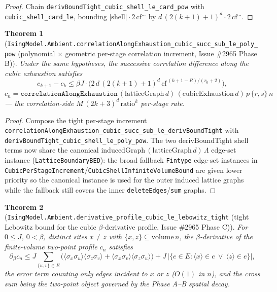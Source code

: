 \documentclass[a4paper,11pt]{article}
\newtheorem{theorem}{Theorem}
\begin{document}
\begin{proof}
Chain \texttt{derivBoundTight\_cubic\_shell\_le\_card\_pow} with
\texttt{cubic\_shell\_card\_le}, bounding $|\mathrm{shell}|\cdot
2\,\mathrm{cf}^{\dots}$ by $d\,(2(k+1)+1)^d\cdot 2\,\mathrm{cf}^{\dots}$.
\end{proof}

\begin{theorem}[\texttt{IsingModel.Ambient.correlationAlongExhaustion\_cubic\_succ\_sub\_le\_poly\_pow}
(polynomial $\times$ geometric per-stage correlation increment, Issue \#2965 Phase B)]
Under the same hypotheses, the successive correlation difference along the cubic
exhaustion satisfies
\[
  c_{k+1}-c_k \le \beta J\cdot\bigl(2\,d\,(2(k+1)+1)^d\,\mathrm{cf}^{\,(k+1-R)/(r_0+2)}\bigr),
\]
$c_n=\texttt{correlationAlongExhaustion}\,(\mathrm{latticeGraph}\,d)\,
(\mathrm{cubicExhaustion}\,d)\,p\,\{r,s\}\,n$ — the correlation-side
$M\,(2k+3)^d\,\mathrm{ratio}^k$ per-stage rate.
\end{theorem}

\begin{proof}
Compose the tight per-stage increment
\texttt{correlationAlongExhaustion\_cubic\_succ\_sub\_le\_derivBoundTight} with
\texttt{derivBoundTight\_cubic\_shell\_le\_poly\_pow}. The two
$\mathrm{derivBoundTight}$ shell terms now share the canonical
$\mathrm{inducedGraph}\,(\mathrm{latticeGraph}\,d)\,\Lambda$ edge-set instance
(\texttt{LatticeBoundaryBED}): the broad fallback \texttt{Fintype} edge-set instances
in \texttt{CubicPerStageIncrement}/\texttt{CubicShellInfiniteVolumeBound} are given
lower priority so the canonical instance is used for the outer induced lattice
graphs while the fallback still covers the inner \texttt{deleteEdges}/\texttt{sum}
graphs.
\end{proof}

\begin{theorem}[\texttt{IsingModel.Ambient.derivative\_profile\_cubic\_le\_lebowitz\_tight}
(tight Lebowitz bound for the cubic $\beta$-derivative profile, Issue \#2965 Phase C)]
For $0\le J$, $0<\beta$, distinct sites $x\neq z$ with
$\{x,z\}\subseteq\mathrm{volume}\,n$, the $\beta$-derivative of the finite-volume
two-point profile $c_n$ satisfies
\[
  \partial_\beta c_n \le J\sum_{\{u,v\}\in E}
    \bigl(\langle\sigma_x\sigma_u\rangle\langle\sigma_z\sigma_v\rangle
      +\langle\sigma_x\sigma_v\rangle\langle\sigma_z\sigma_u\rangle\bigr)
    + J\,|\{e\in E : \langle x\rangle\in e\ \lor\ \langle z\rangle\in e\}|,
\]
the error term counting only edges incident to $x$ or $z$ ($O(1)$ in $n$), and the
cross sum being the two-point object governed by the Phase A--B spatial decay.
\end{theorem}
\end{document}
